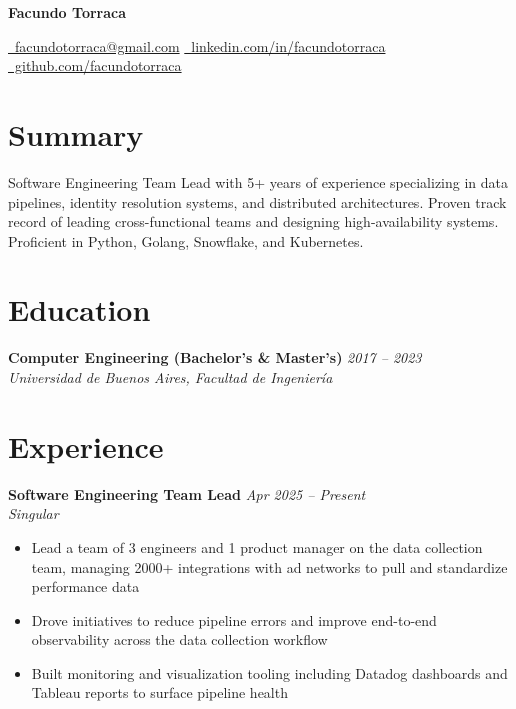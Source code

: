 \documentclass[10pt,a4paper]{article}
\newcommand{\cventry}[3]{%
  \textbf{#1} \hfill \textit{#3}\\[3pt]
  \textit{#2}%
}
\begin{document}
\begin{center}
  {\LARGE\bfseries Facundo Torraca}

  \vspace{0.25cm}

  \href{mailto:facundotorraca@gmail.com}
    {\faEnvelope\ facundotorraca@gmail.com}
  \quad\textperiodcentered\quad
  \href{https://linkedin.com/in/facundotorraca}
    {\faLinkedin\ linkedin.com/in/facundotorraca}
  \quad\textperiodcentered\quad
  \href{https://github.com/facundotorraca}
    {\faGithub\ github.com/facundotorraca}
\end{center}

\section*{Summary}
Software Engineering Team Lead with 5+ years of experience specializing
in data pipelines, identity resolution systems, and distributed
architectures. Proven track record of leading cross-functional teams and
designing high-availability systems. Proficient in Python, Golang,
Snowflake, and Kubernetes.

\section*{Education}

\cventry{Computer Engineering (Bachelor's \& Master's)}%
  {Universidad de Buenos Aires, Facultad de Ingeniería}{2017 -- 2023}

\section*{Experience}

\cventry{Software Engineering Team Lead}{Singular}{Apr 2025 -- Present}
\begin{itemize}[leftmargin=*, noitemsep, topsep=3pt, itemsep=2pt]
  \item Lead a team of 3 engineers and 1 product manager on the data
        collection team, managing 2000+ integrations with ad networks
        to pull and standardize performance data
  \item Drove initiatives to reduce pipeline errors and improve
        end-to-end observability across the data collection workflow
  \item Built monitoring and visualization tooling including Datadog
        dashboards and Tableau reports to surface pipeline health
\end{itemize}
\end{document}
